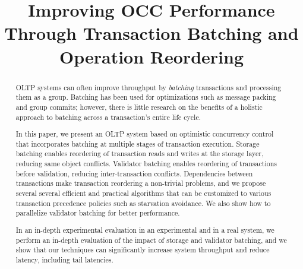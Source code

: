 \documentclass[sigconf]{acmart}
\begin{document}

\title{Improving OCC Performance Through Transaction Batching and Operation Reordering}

%
%

\begin{abstract}
	OLTP systems can often improve throughput by \emph{batching} transactions and processing them as a group. Batching has been used for optimizations such as message packing and group commits; however, there is little research on the benefits of a holistic approach to batching across a transaction's entire life cycle.
	
In this paper, we present an OLTP system based on optimistic concurrency control that incorporates batching at multiple stages of transaction execution. 
Storage batching enables reordering of transaction reads and writes at the storage layer, reducing same object conflicts. Validator batching enables reordering of transactions before validation, reducing inter-transaction conflicts. Dependencies between transactions make transaction reordering a non-trivial problems, and we propose several several efficient and practical algorithms that can be customized to various transaction precedence policies such as starvation avoidance. We also show how to parallelize validator batching for better performance. 

In an in-depth experimental evaluation in an experimental and in a real system, we perform an in-depth evaluation of the impact of storage and validator batching, and we show that our techniques can significantly increase system throughput and reduce latency, including tail latencies.
\end{abstract}

\maketitle



%
%







\end{document}

